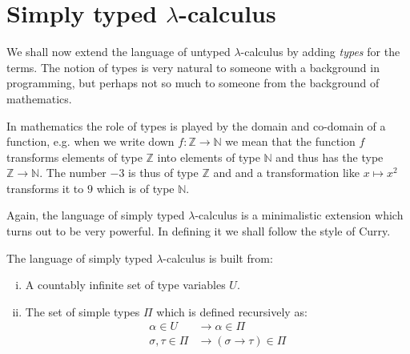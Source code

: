 \section{Simply typed $\lambda$-calculus}

We shall now extend the language of untyped $\lambda$-calculus by
adding \emph{types} for the terms. The notion of types is very natural to
someone with a background in programming, but perhaps not so much to someone
from the background of mathematics.

In mathematics the role of types is played by the domain and co-domain of a
function, e.g. when we write down $f: \mathbb{Z} \rightarrow \mathbb{N}$ we
mean that the function $f$ transforms elements of type $\mathbb{Z}$ into
elements of type $\mathbb{N}$ and thus has the type $\mathbb{Z} \rightarrow
\mathbb{N}$. The number $-3$ is thus of type $\mathbb{Z}$ and and a transformation like
$x \mapsto x^2$ transforms it to $9$ which is of type $\mathbb{N}$.

Again, the language of simply typed $\lambda$-calculus is a minimalistic
extension which turns out to be very powerful. In defining it we shall follow
the style of Curry.

\begin{definition}
The language of simply typed $\lambda$-calculus is built from:
    \begin{enumerate}[(i)]
        \item A countably infinite set of type variables $U$.
        \item The set of simple types $\Pi$ which is defined recursively as:
        \begin{align*}
            \alpha \in U &\rightarrow \alpha \in \Pi \\
            \sigma, \tau \in \Pi &\rightarrow (\sigma \to \tau) \in \Pi
        \end{align*}
    \end{enumerate}
\end{definition}

